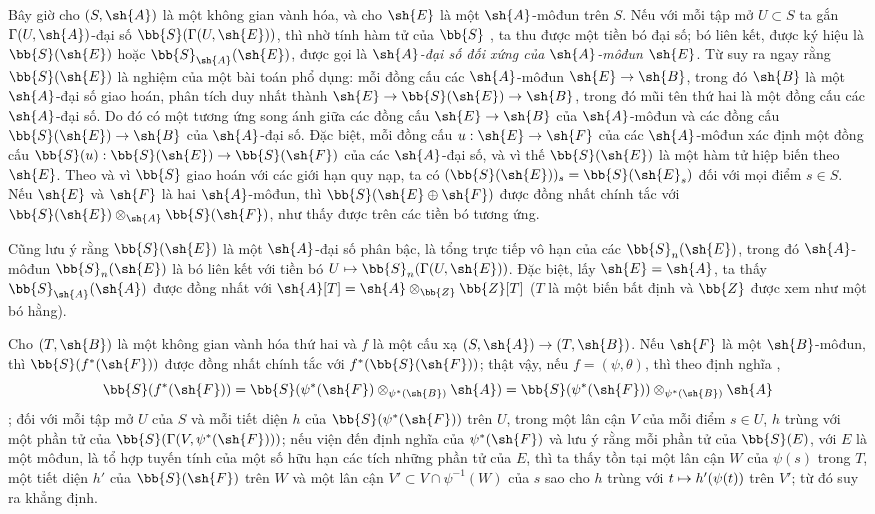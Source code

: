 \documentclass[oneside,10pt]{amsart}
\makeatletter
\newcommand{\ega@arrow}[2]{\mathchoice{#1}{#2}{#2}{#2}}
\let\ega@shortmapsto\mapsto
\renewcommand{\to}{\ega@arrow{\longrightarrow}{\rightarrow}}
\renewcommand{\mapsto}{\ega@arrow{\longmapsto}{\ega@shortmapsto}}
\newcommand{\oldpage}[2][]{\marginnote{\normalfont\footnotesize\textbf{#1}~|~#2}\ignorespaces}
\let\EGAOriginalLabel\label
\renewcommand{\label}[1]{\phantomsection\EGAOriginalLabel{#1}}
\makeatother
\begin{document}
\begin{env}[1.7.4]
\label{II.1.7.4}
Bây giờ cho $(S,\sh{A})$ là một không gian vành hóa, và cho $\sh{E}$ là một $\sh{A}$-môđun trên $S$.
Nếu với mỗi tập mở $U\subset S$ ta gắn $\Gamma(U,\sh{A})$-đại số $\bb{S}(\Gamma(U,\sh{E}))$, thì nhờ tính hàm tử của $\bb{S}$ , ta thu được một tiền bó đại số; bó liên kết, được ký hiệu là $\bb{S}(\sh{E})$ hoặc $\bb{S}_\sh{A}(\sh{E})$, được gọi là \emph{$\sh{A}$-đại số đối xứng của $\sh{A}$-môđun $\sh{E}$}.
Từ  suy ra ngay rằng $\bb{S}(\sh{E})$ là nghiệm của một bài toán phổ dụng: mỗi đồng cấu các $\sh{A}$-môđun $\sh{E}\to\sh{B}$, trong đó $\sh{B}$ là một $\sh{A}$-đại số giao hoán, phân tích duy nhất thành $\sh{E}\to\bb{S}(\sh{E})\to\sh{B}$, trong đó mũi tên thứ hai là một đồng cấu các $\sh{A}$-đại số.
Do đó có một tương ứng song ánh giữa các đồng cấu $\sh{E}\to\sh{B}$ của $\sh{A}$-môđun và các đồng cấu $\bb{S}(\sh{E})\to\sh{B}$ của $\sh{A}$-đại số.
Đặc biệt, mỗi đồng cấu $u:\sh{E}\to\sh{F}$ của các $\sh{A}$-môđun xác định một đồng cấu $\bb{S}(u):\bb{S}(\sh{E})\to\bb{S}(\sh{F})$ của các $\sh{A}$-đại số, và vì thế $\bb{S}(\sh{E})$ là một hàm tử hiệp biến theo $\sh{E}$.
\oldpage[II]{16}
Theo  và vì $\bb{S}$ giao hoán với các giới hạn quy nạp, ta có $(\bb{S}(\sh{E}))_s=\bb{S}(\sh{E}_s)$ đối với mọi điểm $s\in S$.
Nếu $\sh{E}$ và $\sh{F}$ là hai $\sh{A}$-môđun, thì $\bb{S}(\sh{E}\oplus\sh{F})$ được đồng nhất chính tắc với $\bb{S}(\sh{E})\otimes_\sh{A}\bb{S}(\sh{F})$, như thấy được trên các tiền bó tương ứng.

Cũng lưu ý rằng $\bb{S}(\sh{E})$ là một $\sh{A}$-đại số phân bậc, là tổng trực tiếp vô hạn của các $\bb{S}_n(\sh{E})$, trong đó $\sh{A}$-môđun $\bb{S}_n(\sh{E})$ là bó liên kết với tiền bó $U\mapsto\bb{S}_n(\Gamma(U,\sh{E}))$.
Đặc biệt, lấy $\sh{E}=\sh{A}$, ta thấy $\bb{S}_\sh{A}(\sh{A})$ được đồng nhất với $\sh{A}[T]=\sh{A}\otimes_\bb{Z}\bb{Z}[T]$ ($T$ là một biến bất định và $\bb{Z}$ được xem như một bó hằng).
\end{env}

\begin{env}[1.7.5]
\label{II.1.7.5}
Cho $(T,\sh{B})$ là một không gian vành hóa thứ hai và $f$ là một cấu xạ $(S,\sh{A})\to(T,\sh{B})$.
Nếu $\sh{F}$ là một $\sh{B}$-môđun, thì $\bb{S}(f^*(\sh{F}))$ được đồng nhất chính tắc với $f^*(\bb{S}(\sh{F}))$; thật vậy, nếu $f=(\psi,\theta)$, thì theo định nghĩa ,
\[
  \bb{S}(f^*(\sh{F}))=\bb{S}(\psi^*(\sh{F})\otimes_{\psi^*(\sh{B})}\sh{A})=\bb{S}(\psi^*(\sh{F}))\otimes_{\psi^*(\sh{B})}\sh{A}
\]
; đối với mỗi tập mở $U$ của $S$ và mỗi tiết diện $h$ của $\bb{S}(\psi^*(\sh{F}))$ trên $U$, trong một lân cận $V$ của mỗi điểm $s\in U$, $h$ trùng với một phần tử của $\bb{S}(\Gamma(V,\psi^*(\sh{F})))$; nếu viện đến định nghĩa của $\psi^*(\sh{F})$  và lưu ý rằng mỗi phần tử của $\bb{S}(E)$, với $E$ là một môđun, là tổ hợp tuyến tính của một số hữu hạn các tích những phần tử của $E$, thì ta thấy tồn tại một lân cận $W$ của $\psi(s)$ trong $T$, một tiết diện $h'$ của $\bb{S}(\sh{F})$ trên $W$ và một lân cận $V'\subset V\cap\psi^{-1}(W)$ của $s$ sao cho $h$ trùng với $t\mapsto h'(\psi(t))$ trên $V'$; từ đó suy ra khẳng định.
\end{env}
\end{document}
